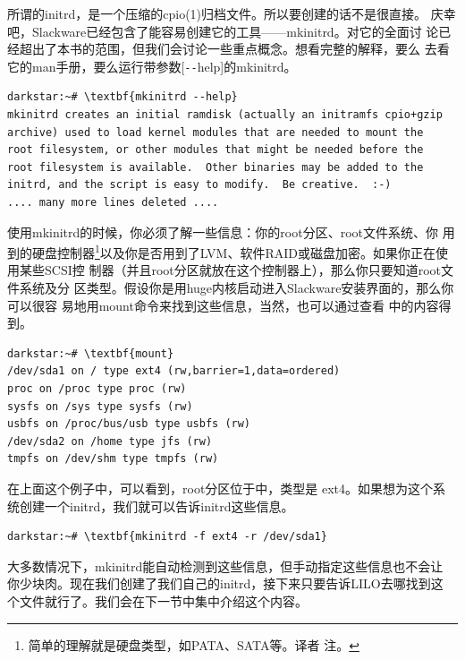 所谓的initrd，是一个压缩的cpio(1)归档文件。所以要创建的话不是很直接。
庆幸吧，Slackware已经包含了能容易创建它的工具——mkinitrd。对它的全面讨
论已经超出了本书的范围，但我们会讨论一些重点概念。想看完整的解释，要么
去看它的man手册，要么运行带参数[\verb|--|help]的mkinitrd。
\begin{Verbatim}[frame=single,commandchars=\\\{\}]
darkstar:~# \textbf{mkinitrd --help}
mkinitrd creates an initial ramdisk (actually an initramfs cpio+gzip
archive) used to load kernel modules that are needed to mount the
root filesystem, or other modules that might be needed before the
root filesystem is available.  Other binaries may be added to the
initrd, and the script is easy to modify.  Be creative.  :-)
.... many more lines deleted ....
\end{Verbatim}
使用mkinitrd的时候，你必须了解一些信息：你的root分区、root文件系统、你
用到的硬盘控制器\footnote{简单的理解就是硬盘类型，如PATA、SATA等。译者
注。}以及你是否用到了LVM、软件RAID或磁盘加密。如果你正在使用某些SCSI控
制器（并且root分区就放在这个控制器上），那么你只要知道root文件系统及分
区类型。假设你是用huge内核启动进入Slackware安装界面的，那么你可以很容
易地用mount命令来找到这些信息，当然，也可以通过查看
中的内容得到。
\begin{Verbatim}[frame=single,commandchars=\\\{\}]
darkstar:~# \textbf{mount}
/dev/sda1 on / type ext4 (rw,barrier=1,data=ordered)
proc on /proc type proc (rw)
sysfs on /sys type sysfs (rw)
usbfs on /proc/bus/usb type usbfs (rw)
/dev/sda2 on /home type jfs (rw)
tmpfs on /dev/shm type tmpfs (rw)
\end{Verbatim}
在上面这个例子中，可以看到，root分区位于中，类型是
ext4。如果想为这个系统创建一个initrd，我们就可以告诉initrd这些信息。
\begin{Verbatim}[frame=single,commandchars=\\\{\}]
darkstar:~# \textbf{mkinitrd -f ext4 -r /dev/sda1}
\end{Verbatim}
大多数情况下，mkinitrd能自动检测到这些信息，但手动指定这些信息也不会让
你少块肉。现在我们创建了我们自己的initrd，接下来只要告诉LILO去哪找到这
个文件就行了。我们会在下一节中集中介绍这个内容。

